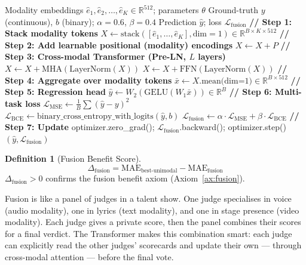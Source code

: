 \documentclass[12pt,a4paper]{article}
\theoremstyle{definition}
\newtheorem{definition}{Definition}[section]
\theoremstyle{plain}
\theoremstyle{remark}
\newcommand{\R}{\mathbb{R}}
\newcommand{\LN}{\mathrm{LayerNorm}}
\newcommand{\GELU}{\mathrm{GELU}}
\newcommand{\MHA}{\mathrm{MHA}}
\begin{document}
\begin{algorithm}[H]
\caption{Challenge 3: Multimodal Fusion (Cross-Modal Transformer)}
\label{alg:fusion}
\begin{algorithmic}[1]
\Require Modality embeddings $\hat{e}_1, \hat{e}_2, \ldots, \hat{e}_K \in \R^{512}$; parameters $\theta$
\Require Ground-truth $y$ (continuous), $b$ (binary); $\alpha=0.6$, $\beta=0.4$
\Ensure Prediction $\hat{y}$; loss $\mathcal{L}_{\text{fusion}}$
\State \textbf{// Step 1: Stack modality tokens}
\State $X \gets \text{stack}([\hat{e}_1,\ldots,\hat{e}_K], \text{dim}=1) \in \R^{B \times K \times 512}$
\State \textbf{// Step 2: Add learnable positional (modality) encodings}
\State $X \gets X + P$ \Comment{$P \in \R^{K \times 512}$, learned modality tags}
\State \textbf{// Step 3: Cross-modal Transformer (Pre-LN, $L$ layers)}
  \State $X \gets X + \MHA(\LN(X))$ 
  \State $X \gets X + \text{FFN}(\LN(X))$
\EndFor
\State \textbf{// Step 4: Aggregate over modality tokens}
\State $\bar{x} \gets X.\text{mean(dim=1)} \in \R^{B \times 512}$
\State \textbf{// Step 5: Regression head}
\State $\hat{y} \gets W_2(\GELU(W_1 \bar{x})) \in \R^B$ 
\State \textbf{// Step 6: Multi-task loss}
\State $\mathcal{L}_{\text{MSE}} \gets \frac{1}{B}\sum({\hat{y} - y})^2$
\State $\mathcal{L}_{\text{BCE}} \gets \text{binary\_cross\_entropy\_with\_logits}(\hat{y}, b)$
\State $\mathcal{L}_{\text{fusion}} \gets \alpha \cdot \mathcal{L}_{\text{MSE}} + \beta \cdot \mathcal{L}_{\text{BCE}}$
\State \textbf{// Step 7: Update}
\State optimizer.zero\_grad(); $\mathcal{L}_{\text{fusion}}$.backward(); optimizer.step()
\State \Return $(\hat{y}, \mathcal{L}_{\text{fusion}})$
\end{algorithmic}
\end{algorithm}

\begin{definition}[Fusion Benefit Score]
\[
  \Delta_{\text{fusion}} = \text{MAE}_{\text{best-unimodal}} - \text{MAE}_{\text{fusion}}
\]
$\Delta_{\text{fusion}} > 0$ confirms the fusion benefit axiom (Axiom~\ref{ax:fusion}).
\end{definition}

\begin{tcolorbox}[laymanbox]
Fusion is like a panel of judges in a talent show. One judge specialises in voice (audio modality), one in lyrics (text modality), and one in stage presence (video modality). Each judge gives a private score, then the panel combines their scores for a final verdict. The Transformer makes this combination smart: each judge can explicitly read the other judges' scorecards and update their own — through cross-modal attention — before the final vote.
\end{tcolorbox}
\end{document}
